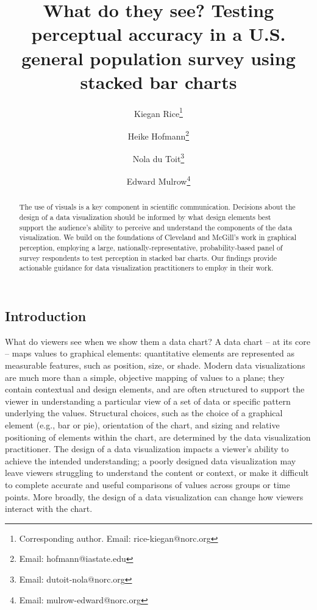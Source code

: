 \documentclass[
]{jds}
\author[1]{Kiegan Rice\thanks{Corresponding author. Email: rice-kiegan@norc.org}}
\author[2]{Heike Hofmann\footnote{Email: hofmann@iastate.edu}}
\author[1]{Nola du Toit\footnote{Email: dutoit-nola@norc.org}}
\author[1]{Edward Mulrow\footnote{Email: mulrow-edward@norc.org}}
\affil[1]{NORC at the University of Chicago}
\affil[2]{Department of Statistics, Iowa State University}
\title[Testing stacked bar charts in surveys]{What do they see? Testing perceptual accuracy in a U.S. general population survey using stacked bar charts}
\date{}
\begin{document}
\maketitle
\begin{abstract}
The use of visuals is a key component in scientific communication.
Decisions about the design of a data visualization should be informed by
what design elements best support the audience's ability to perceive and
understand the components of the data visualization. We build on the
foundations of Cleveland and McGill's work in graphical perception,
employing a large, nationally-representative, probability-based panel of
survey respondents to test perception in stacked bar charts. Our
findings provide actionable guidance for data visualization
practitioners to employ in their work.
\end{abstract}
\ifdefined\Shaded\renewenvironment{Shaded}{\begin{tcolorbox}[breakable, boxrule=0pt, interior hidden, sharp corners, borderline west={3pt}{0pt}{shadecolor}, enhanced, frame hidden]}{\end{tcolorbox}}\fi


  \newcommand{\blandscape}{\begin{landscape}} 
  \newcommand{\elandscape}{\end{landscape}}

  \setlength{\parindent}{0pt}
  \singlespacing

\hypertarget{introduction}{%
\subsection{Introduction}\label{introduction}}

What do viewers see when we show them a data chart? A data chart -- at
its core -- maps values to graphical elements: quantitative elements are
represented as measurable features, such as position, size, or shade.
Modern data visualizations are much more than a simple, objective
mapping of values to a plane; they contain contextual and design
elements, and are often structured to support the viewer in
understanding a particular view of a set of data or specific pattern
underlying the values. Structural choices, such as the choice of a
graphical element (e.g., bar or pie), orientation of the chart, and
sizing and relative positioning of elements within the chart, are
determined by the data visualization practitioner. The design of a data
visualization impacts a viewer's ability to achieve the intended
understanding; a poorly designed data visualization may leave viewers
struggling to understand the content or context, or make it difficult to
complete accurate and useful comparisons of values across groups or time
points. More broadly, the design of a data visualization can change how
viewers interact with the chart.
\end{document}
